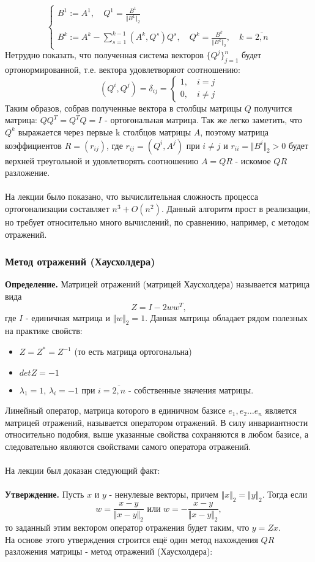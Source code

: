 \documentclass[a4paper,12pt,titlepage,final]{article}
\begin{document}
$$ \begin{cases}
B^1 := A^1, \quad Q^1 = \frac{B^1}{\Vert B^1 \Vert_2} \\ \\
B^k := A^k - \sum_{s = 1}^{k-1} (A^k, Q^s) Q^s, \quad Q^k = \frac{B^k}{\Vert B^k \Vert_2}, \quad k = \overline{2,n}
\end{cases} $$
Нетрудно показать, что полученная система векторов $\{Q^j\}_{j=1}^{n}$ будет ортонормированной, т.е. вектора удовлетворяют соотношению:
$$(Q^i, Q^j) = \delta_{ij} = 
\begin{cases}
    1, \quad i = j \\
    0, \quad i \neq j
\end{cases}
$$
Таким образов, собрав полученные вектора в столбцы матрицы $Q$ получится матрица: $QQ^T = Q^TQ = I$ - ортогональная матрица. Так же легко заметить, что $Q^k$ выражается через первые k столбцов матрицы $A$, поэтому матрица коэффициентов $R = (r_{ij})$, где $r_{ij} = (Q^i, A^j)$ при $i \neq j$ и $r_{ii} = \Vert B^i \Vert_2 > 0$ будет верхней треугольной и удовлетворять соотношению $A = QR$ - искомое $QR$ разложение. \\ \\
На лекции было показано, что вычислительная сложность процесса ортогонализации составляет $n^3 + O(n^2)$. Данный алгоритм прост в реализации, но требует относительно много вычислений, по сравнению, например, с методом отражений.
\subsubsection{Метод отражений (Хаусхолдера)}
\textbf{Определение.} Матрицей отражений (матрицей Хаусхолдера) называется матрица вида $$Z = I - 2 ww^T,$$ где $I$ - единичная матрица и $\Vert w \Vert_2 = 1$. Данная матрица обладает рядом полезных на практике свойств:
\begin{itemize}
    \item $Z = Z^* = Z^{-1}$ (то есть матрица ортогональна)
    \item $detZ = -1$
    \item $\lambda_1 = 1$, $\lambda_i = -1$ при $i = \overline{2, n}$ - собственные значения матрицы.
\end{itemize}
Линейный оператор, матрица которого в единичном базисе $e_1, e_2 \ldots e_n$ является матрицей отражений, называется оператором отражений. В силу инвариантности относительно подобия, выше указанные свойства сохраняются в любом базисе, а следовательно являются свойствами самого оператора отражений. \\ \\
На лекции был доказан следующий факт: \\ \\
\textbf{Утверждение.} Пусть $x$ и $y$ - ненулевые векторы, причем $\Vert x \Vert_2 = \Vert y \Vert_2$. Тогда если $$w = \frac{x - y}{\Vert x - y\Vert_2} \text{ или } w = -\frac{x - y}{\Vert x - y\Vert_2},$$
то заданный этим вектором оператор отражения будет таким, что $y = Zx$. \\ На основе этого утверждения строится ещё один метод нахождения $QR$ разложения матрицы - метод отражений (Хаусхолдера): \\ \\
\end{document}
